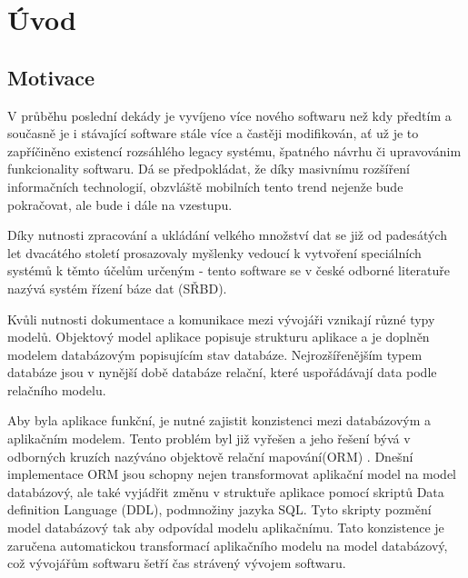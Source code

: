 \documentclass[11pt,twoside,a4paper]{book}
\begin{document}
\listoftables



\mainbodystarts


% 
% 

\chapter{Úvod}
\section{Motivace}

V průběhu poslední dekády je vyvíjeno více nového softwaru než kdy předtím a
současně je i stávající software stále více a častěji modifikován, ať už
je to zapříčiněno  existencí rozsáhlého legacy systému, špatného návrhu či
upravovánim funkcionality softwaru. Dá se předpokládat, že díky masivnímu
rozšíření informačních technologií, obzvláště mobilních tento trend nejenže bude
pokračovat, ale bude i dále na vzestupu.

Díky nutnosti zpracování a ukládání velkého množství dat se již od padesátých
let dvacátého století prosazovaly myšlenky vedoucí k vytvoření speciálních
systémů k těmto účelům určeným - tento software se v české odborné literatuře
nazývá systém řízení báze dat (SŘBD). 

Kvůli nutnosti dokumentace a komunikace mezi vývojáři vznikají různé typy
modelů. Objektový model aplikace popisuje strukturu aplikace a je doplněn 
modelem databázovým popisujícím stav databáze. Nejrozšířenějším typem
databáze jsou v nynější době databáze relační, které uspořádávají data podle
relačního modelu. 

Aby byla aplikace funkční, je nutné zajistit konzistenci mezi databázovým a
aplikačním modelem.
Tento problém byl již vyřešen a jeho řešení bývá v odborných kruzích nazýváno
objektově relační mapování(ORM) \cite{orm}. Dnešní implementace ORM jsou schopny nejen
transformovat aplikační model na model databázový, ale také vyjádřit změnu v struktuře
aplikace pomocí skriptů Data definition Language (DDL), podmnožiny jazyka SQL.
Tyto skripty pozmění model databázový tak aby odpovídal modelu aplikačnímu.
Tato konzistence je zaručena automatickou transformací aplikačního modelu na
model databázový, což vývojářům softwaru šetří čas strávený vývojem softwaru.
\end{document}
